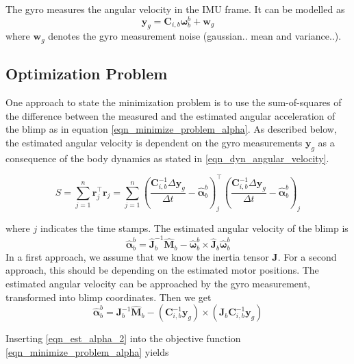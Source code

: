 The gyro measures the angular velocity in the IMU frame. It can be modelled as
\begin{equation}
\mathbf{y}_{g} = \mathbf{C}_{i,b} \boldsymbol{\omega}_b^b + \mathbf{w}_g
\end{equation}
where $\mathbf{w}_g$ denotes the gyro measurement noise (gaussian.. mean and variance..).

\subsection{Optimization Problem}
One approach to state the minimization problem is to use the sum-of-squares of the difference between the measured and the estimated angular acceleration of the blimp as in equation \eqref{eqn_minimize_problem_alpha}. As described below, the estimated angular velocity is dependent on the gyro measurements $\mathbf{y}_g$ as a consequence of the body dynamics as stated in \eqref{eqn_dyn_angular_velocity}.

\begin{equation}
\label{eqn_minimize_problem_alpha}
S = \sum_{j=1}^n {\mathbf{r}_j^\top \mathbf{r}_j} = \sum_{j=1}^n {
\left( \frac{\mathbf{C}_{i,b}^{-1} \Delta \mathbf{y}_g}{\Delta t} - \hat{\boldsymbol{\alpha}}_b^b \right)_j^\top
\left( \frac{\mathbf{C}_{i,b}^{-1} \Delta \mathbf{y}_g}{\Delta t} - \hat{\boldsymbol{\alpha}}_b^b \right)_j }
\end{equation}

where $j$ indicates the time stamps. The estimated angular velocity of the blimp is
\begin{equation}
\label{eqn_est_alpha_1}
\hat{\boldsymbol{\alpha}}_b^b = \hat{\mathbf{J}}_b^{-1} \hat{\mathbf{M}}_b  - \hat{\boldsymbol{\omega}}_b^b \times \hat{\mathbf{J}}_b \hat{\boldsymbol{\omega}}_b^b
\end{equation}
In a first approach, we assume that we know the inertia tensor $\mathbf{J}$. For a second approach, this should be depending on the estimated motor positions. The estimated angular velocity can be approached by the gyro measurement, transformed into blimp coordinates. Then we get
\begin{equation}
\label{eqn_est_alpha_2}
\hat{\boldsymbol{\alpha}}_b^b = \mathbf{J}_b^{-1} \hat{\mathbf{M}}_b  - \left( \mathbf{C}_{i,b}^{-1} \mathbf{y}_g \right) \times \left( \mathbf{J}_b \mathbf{C}_{i,b}^{-1} \mathbf{y}_g \right)
\end{equation}

Inserting \eqref{eqn_est_alpha_2} into the objective function \eqref{eqn_minimize_problem_alpha} yields

